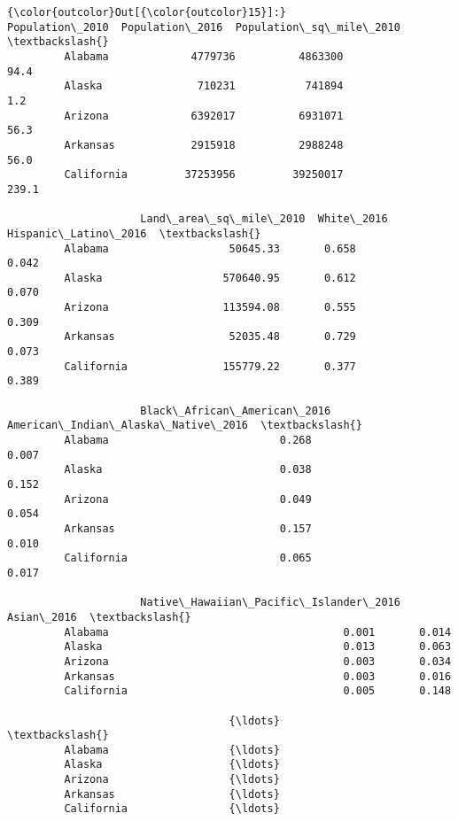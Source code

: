 \documentclass[11pt]{article}
\begin{document}
\begin{Verbatim}[commandchars=\\\{\}]
{\color{outcolor}Out[{\color{outcolor}15}]:}             Population\_2010  Population\_2016  Population\_sq\_mile\_2010  \textbackslash{}
         Alabama             4779736          4863300                     94.4   
         Alaska               710231           741894                      1.2   
         Arizona             6392017          6931071                     56.3   
         Arkansas            2915918          2988248                     56.0   
         California         37253956         39250017                    239.1   
         
                     Land\_area\_sq\_mile\_2010  White\_2016  Hispanic\_Latino\_2016  \textbackslash{}
         Alabama                   50645.33       0.658                 0.042   
         Alaska                   570640.95       0.612                 0.070   
         Arizona                  113594.08       0.555                 0.309   
         Arkansas                  52035.48       0.729                 0.073   
         California               155779.22       0.377                 0.389   
         
                     Black\_African\_American\_2016  American\_Indian\_Alaska\_Native\_2016  \textbackslash{}
         Alabama                           0.268                               0.007   
         Alaska                            0.038                               0.152   
         Arizona                           0.049                               0.054   
         Arkansas                          0.157                               0.010   
         California                        0.065                               0.017   
         
                     Native\_Hawaiian\_Pacific\_Islander\_2016  Asian\_2016  \textbackslash{}
         Alabama                                     0.001       0.014   
         Alaska                                      0.013       0.063   
         Arizona                                     0.003       0.034   
         Arkansas                                    0.003       0.016   
         California                                  0.005       0.148   
         
                                   {\ldots}                  \textbackslash{}
         Alabama                   {\ldots}                   
         Alaska                    {\ldots}                   
         Arizona                   {\ldots}                   
         Arkansas                  {\ldots}                   
         California                {\ldots}                   
         

\end{Verbatim}
\end{document}
